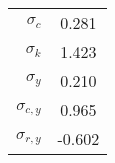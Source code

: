 \begin{center}
\begin{tabular}{r c}
& \\ \hline
$\sigma_c$        & 0.281 \\ 
$\sigma_k$        & 1.423 \\ 
$\sigma_y$        & 0.210 \\ 
$\sigma_{c,y}$    & 0.965 \\ 
$\sigma_{r,y}$    & -0.602 \\ \hline
\end{tabular}
\end{center}